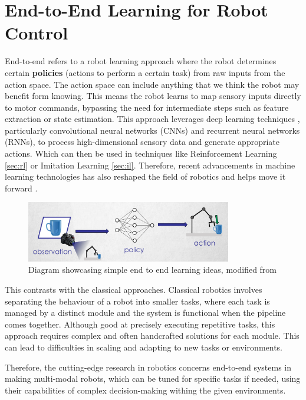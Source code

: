 \section{End-to-End Learning for Robot Control}

  End-to-end refers to a robot learning approach where the robot determines certain \textbf{policies} (actions to perform a certain task) from raw inputs from the action space. The action space can include anything that we think the robot may benefit form knowing. This means the 
  robot learns to map sensory inputs directly to motor commands, bypassing the need for intermediate steps such as feature extraction or state estimation. This approach leverages deep learning techniques \cite{Schmidhuber2015nn}, particularly convolutional neural networks (CNNs) and recurrent neural networks (RNNs), to process high-dimensional sensory data and generate appropriate actions. Which can then be used in techniques like Reinforcement Learning \ref{sec:rl} or Imitation Learning \ref{sec:il}. Therefore, recent advancements in machine learning technologies has also reshaped the field of robotics and helps move it forward \cite{Pierson18082017,newbury2023graspSynthReview,liu2021DRLminireview}.

  \begin{figure}[h]
    \centering
    \includegraphics[width=0.8\textwidth]{assets/intro/endtoend.png}
    \caption{Diagram showcasing simple end to end learning ideas, modified from \cite{johns2024}}\label{fig:end2end}
  \end{figure}

  This contrasts with the classical approaches. Classical robotics involves separating the behaviour of a robot into smaller tasks, where each task is managed by a distinct module and the system is functional when the pipeline comes together. Although good at precisely executing repetitive tasks, this approach requires complex and often handcrafted solutions for each module. This can lead to difficulties in scaling and adapting to new tasks or environments. 
  
  Therefore, the cutting-edge research in robotics concerns end-to-end systems in making multi-modal robots, which can be tuned for specific tasks if needed, using their capabilities of complex decision-making withing the given environments.






